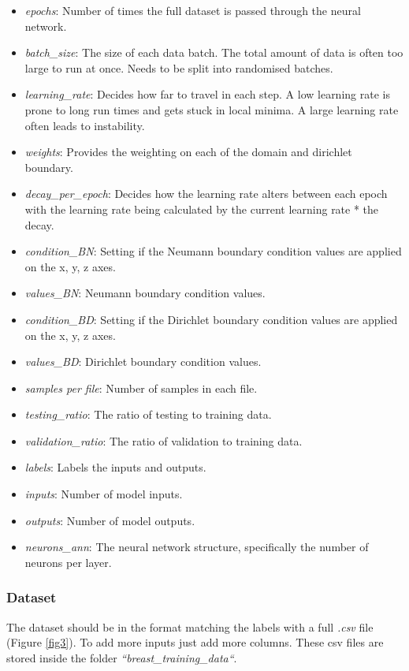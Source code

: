 \documentclass[11pt]{article}
\providecommand{\tightlist}{%
      \setlength{\itemsep}{0pt}\setlength{\parskip}{0pt}}
\begin{document}
\begin{itemize}
\tightlist
\item
  \textit{epochs}: Number of times the full dataset is passed through the neural
  network.
\item
  \textit{batch\_size}: The size of each data batch. The total amount of data
  is often too large to run at once. Needs to be split into randomised batches.
\item
  \textit{learning\_rate}: Decides how far to travel in each step. A low
  learning rate is prone to long run times and gets stuck in
  local minima. A large learning rate often leads to instability.
\item
  \textit{weights}: Provides the weighting on each of the domain and dirichlet boundary.
\item
  \textit{decay\_per\_epoch}: Decides how the learning rate alters between each
  epoch with the learning rate being calculated by the current learning
  rate * the decay.
\item
  \textit{condition\_BN}: Setting if the Neumann boundary condition values are applied on the x, y, z axes.
\item
  \textit{values\_BN}: Neumann boundary condition values. 
\item
  \textit{condition\_BD}: Setting if the Dirichlet boundary condition values are applied on the x, y, z axes.
\item
  \textit{values\_BD}: Dirichlet boundary condition values. 
\item
  \textit{samples per file}: Number of samples in each file.
\item
  \textit{testing\_ratio}: The ratio of testing to training data.
\item
  \textit{validation\_ratio}: The ratio of validation to training data.
\item
  \textit{labels}: Labels the inputs and outputs.
\item
  \textit{inputs}: Number of model inputs.
\item
  \textit{outputs}: Number of model outputs.
\item
  \textit{neurons\_ann}: The neural network structure, specifically the number of neurons per layer.
\end{itemize}

\subsubsection{Dataset}
The dataset should be in the format matching the labels with a full \textit{.csv} file (Figure \ref{fig3}). To add more inputs just add more columns. These csv files are stored inside the folder \textit{``breast\_training\_data``}.
\end{document}
